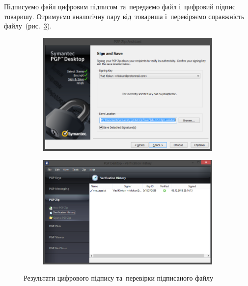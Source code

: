 \documentclass[
	a4paper,
	oneside,
	BCOR = 10mm,
	DIV = 12,
	12pt,
	headings = normal,
]{scrartcl}
\newlength{\gridunitwidth}
\begin{document}
		Підписуємо файл цифровим підписом та~передаємо файл і~цифровий підпис товаришу. Отримуємо аналогічну пару від~товариша і~перевіряємо справжність файлу~(рис.~\ref{fig:sign-verify-file}).

		\begin{figure}[!htbp]
			\begin{subfigure}[b]{6 \gridunitwidth - 1em / (2-1)}
				\includegraphics[width = \columnwidth]{./assets/p16.png}
				\caption{}
				\label{subfig:sign}
			\end{subfigure}%
			\hspace{1em}%
			\begin{subfigure}[b]{6 \gridunitwidth - 1em / (2-1)}
				\includegraphics[width = \columnwidth]{./assets/p17.png}
				\caption{}
				\label{subfig:verify}
			\end{subfigure}
			\caption{Результати цифрового підпису та~перевірки підписаного файлу}
			\label{fig:sign-verify-file}
		\end{figure}
\end{document}
